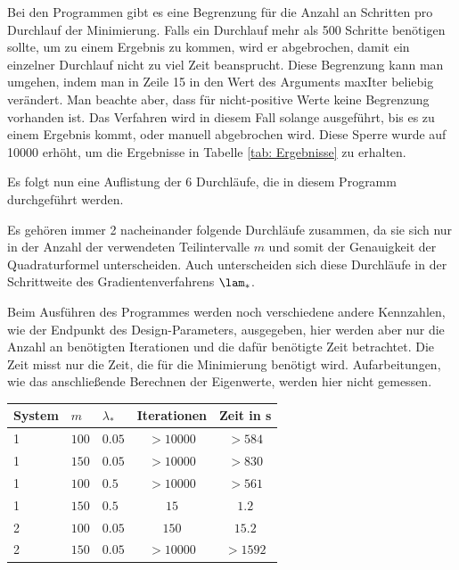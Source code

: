 \documentclass[a4paper,12pt]{report}
\newcommand{\zitat}[1]{\glqq #1\grqq}
\newcommand{\1}{\mathds{1}}
\theoremstyle{plain} %
\theoremstyle{definition} %
\theoremstyle{remark}
\begin{document}
            Bei den Programmen gibt es eine Begrenzung für die Anzahl an Schritten pro Durchlauf der Minimierung.
            Falls ein Durchlauf mehr als 500 Schritte benötigen sollte, um zu einem Ergebnis zu kommen, wird er abgebrochen, damit ein einzelner Durchlauf nicht zu viel Zeit beansprucht.
            Diese Begrenzung kann man umgehen, indem man in Zeile 15 in  den Wert des Arguments \mbox{\zitat{maxIter}} beliebig verändert.
            Man beachte aber, dass für nicht-positive Werte keine Begrenzung vorhanden ist.
            Das Verfahren wird in diesem Fall solange ausgeführt, bis es zu einem Ergebnis kommt, oder manuell abgebrochen wird.
            Diese Sperre wurde auf 10000 erhöht, um die Ergebnisse in Tabelle \ref{tab: Ergebnisse} zu erhalten.

            Es folgt nun eine Auflistung der 6 Durchläufe, die in diesem Programm durchgeführt werden.

            Es gehören immer 2 nacheinander folgende Durchläufe zusammen, da sie sich nur in der Anzahl der verwendeten Teilintervalle $m$
            und somit der Genauigkeit der Quadraturformel unterscheiden.
            Auch unterscheiden sich diese Durchläufe in der Schrittweite des Gradientenverfahrens $\lam_*$.

            Beim Ausführen des Programmes werden noch verschiedene andere Kennzahlen, wie der Endpunkt des Design-Parameters, ausgegeben,
            hier werden aber nur die Anzahl an benötigten Iterationen und die dafür benötigte Zeit betrachtet.
            Die Zeit misst nur die Zeit, die für die Minimierung benötigt wird.
            Aufarbeitungen, wie das anschließende Berechnen der Eigenwerte, werden hier nicht gemessen. \\

            \begin{table}[ht]
                  \centering
                  \begin{tabular}{lllcc}
                       System & $m$ & $\lambda_*$ & Iterationen & Zeit in s\\
                       \hline
                       1 & $100$ & $0.05$ & $>10000$ & $>584$ \\ 
                       1 & $150$ & $0.05$ & $>10000$ & $>830$ \\
                       \hline
                       1 & $100$ & $0.5$ & $>10000$ & $>561$ \\
                       1 & $150$ & $0.5$ & $15$ & $1.2$ \\
                       \hline
                       2 & $100$ & $0.05$ & $150$ & $15.2$ \\
                       2 & $150$ & $0.05$ & $>10000$ & $>1592$ \\
                       \hline
                  \end{tabular}\\
            \end{table}
\end{document}
